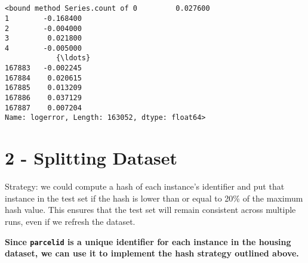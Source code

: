 \documentclass[11pt]{article}
\makeatletter
\newcommand{\boxspacing}{\kern\kvtcb@left@rule\kern\kvtcb@boxsep}
\newcommand{\prompt}[4]{
        {\ttfamily\llap{{\color{#2}[#3]:\hspace{3pt}#4}}\vspace{-\baselineskip}}
    }
\makeatother
\begin{document}
    \begin{center}
    \end{center}
    { \hspace*{\fill} \\}
    
    \begin{center}
    \end{center}
    { \hspace*{\fill} \\}
    
            \begin{tcolorbox}[breakable, size=fbox, boxrule=.5pt, pad at break*=1mm, opacityfill=0]
\prompt{Out}{outcolor}{12}{\boxspacing}
\begin{Verbatim}[commandchars=\\\{\}]
<bound method Series.count of 0         0.027600
1        -0.168400
2        -0.004000
3         0.021800
4        -0.005000
            {\ldots}
167883   -0.002245
167884    0.020615
167885    0.013209
167886    0.037129
167887    0.007204
Name: logerror, Length: 163052, dtype: float64>
\end{Verbatim}
\end{tcolorbox}
        
    \hypertarget{splitting-dataset}{%
\section{2 - Splitting Dataset}\label{splitting-dataset}}

Strategy: we could compute a hash of each instance's identifier and put
that instance in the test set if the hash is lower than or equal to 20\%
of the maximum hash value. This ensures that the test set will remain
consistent across multiple runs, even if we refresh the dataset.

\textbf{Since \texttt{parcelid} is a unique identifier for each instance
in the housing dataset, we can use it to implement the hash strategy
outlined above.}
\end{document}
